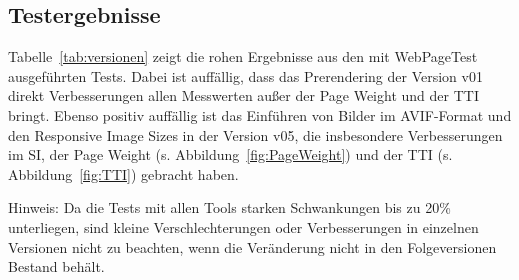 \documentclass[11pt,a4paper]{article}
\begin{document}
\subsection{Testergebnisse}
Tabelle~\ref{tab:versionen} zeigt die rohen Ergebnisse aus den mit WebPageTest ausgeführten Tests.
Dabei ist auffällig, dass das Prerendering der Version v01 direkt Verbesserungen allen Messwerten außer der Page Weight und der TTI bringt.
Ebenso positiv auffällig ist das Einführen von Bilder im AVIF-Format und den Responsive Image Sizes in der Version v05, die insbesondere Verbesserungen im SI, der Page Weight (s. Abbildung~\ref{fig:PageWeight}) und der TTI (s. Abbildung~\ref{fig:TTI}) gebracht haben.

Hinweis: Da die Tests mit allen Tools starken Schwankungen bis zu 20\% unterliegen, sind kleine Verschlechterungen oder Verbesserungen in einzelnen Versionen nicht zu beachten, wenn die Veränderung nicht in den Folgeversionen Bestand behält.
\end{document}
